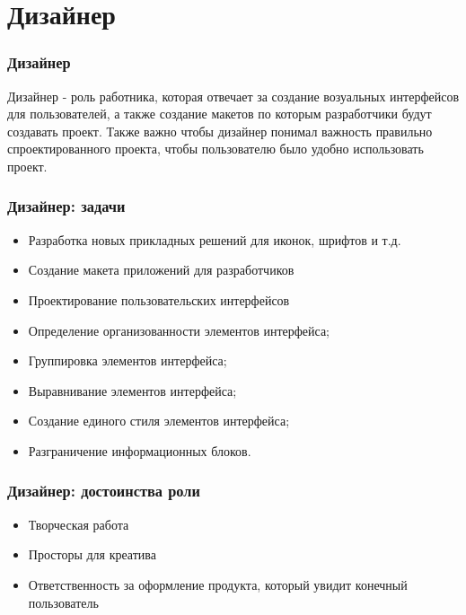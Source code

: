 \documentclass{../industrial-development}
\begin{document}
	\section{Дизайнер }
	
	\begin{frame} \frametitle{Дизайнер}
		\begin{block}{}
			\alert {Дизайнер} - роль работника, которая отвечает за создание возуальных интерфейсов для пользователей, а также создание макетов по которым разработчики будут создавать проект. Также важно чтобы дизайнер понимал важность правильно спроектированного проекта, чтобы пользователю было удобно использовать проект.
		\end{block}
		
	\end{frame}
	
	\begin{frame} \frametitle{Дизайнер: задачи}
		\begin{block}{}
			\begin{itemize}
				\item Разработка новых прикладных решений для иконок, шрифтов и т.д.
				\item Создание макета приложений для разработчиков
				\item Проектирование пользовательских интерфейсов
				\item Определение организованности элементов интерфейса;
				\item Группировка элементов интерфейса;
				\item Выравнивание элементов интерфейса;
				\item Создание единого стиля элементов интерфейса;
				\item Разграничение информационных блоков.
			\end{itemize}
		\end{block}
	\end{frame}
	
	\begin{frame} \frametitle{Дизайнер: достоинства роли}
		\begin{block}{}
			\begin{itemize}
				\item Творческая работа
				\item Просторы для креатива
				\item Ответственность за оформление продукта, который увидит конечный пользователь
			\end{itemize}
		\end{block}
	\end{frame}
	
\end{document}
